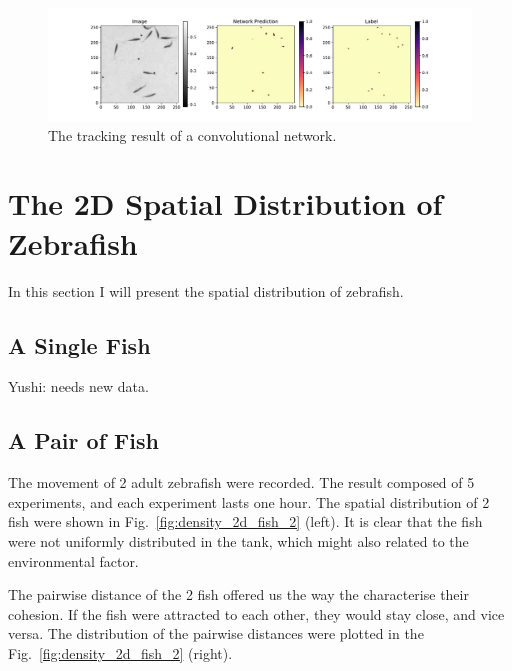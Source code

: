 \documentclass[11pt,twoside]{report}
\begin{document}
\begin{figure}
  \includegraphics[width=\linewidth]{track-cnn}
  \caption{
	The tracking result of a convolutional network.
  }
  \label{fig:track_cnn}
\end{figure}

\section{The 2D Spatial Distribution of Zebrafish}

In this section I will present the spatial distribution of zebrafish.

\subsection{A Single Fish}
\label{section:fish_1_2d}

Yushi: needs new data.

\subsection{A Pair of Fish}
\label{section:fish_2_2d}

The movement of 2 adult zebrafish were recorded. The result composed of 5 experiments, and each experiment lasts one hour.
The spatial distribution of 2 fish were shown in Fig.~\ref{fig:density_2d_fish_2} (left). It is clear that the fish were not uniformly distributed in the tank, which might also related to the environmental factor.

The pairwise distance of the 2 fish offered us the way the characterise their cohesion. If the fish were attracted to each other, they would stay close, and vice versa. The distribution of the pairwise distances were plotted in the Fig.~\ref{fig:density_2d_fish_2} (right).  
\end{document}
